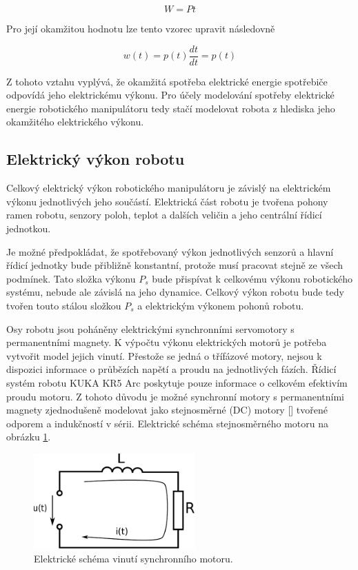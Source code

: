 \begin{equation}
W = Pt
\end{equation}

Pro její okamžitou hodnotu lze tento vzorec upravit následovně

\begin{equation}
w(t) = p(t)\frac{dt}{dt} = p(t)
\end{equation}  

Z tohoto vztahu vyplývá, že okamžitá spotřeba elektrické energie spotřebiče odpovídá jeho elektrickému výkonu. Pro účely modelování spotřeby elektrické energie robotického manipulátoru tedy stačí modelovat robota z hlediska jeho okamžitého elektrického výkonu.  

\subsection{Elektrický výkon robotu}

Celkový elektrický výkon robotického manipulátoru je závislý na elektrickém výkonu jednotlivých jeho součástí. Elektrická část robotu je tvořena pohony ramen robotu, senzory poloh, teplot a dalších veličin a jeho centrální řídicí jednotkou. 

Je možné předpokládat, že spotřebovaný výkon jednotlivých senzorů a hlavní řídicí jednotky bude přibližně konstantní, protože musí pracovat stejně ze všech podmínek. Tato složka výkonu $P_s$ bude přispívat k celkovému výkonu robotického systému, nebude ale závislá na jeho dynamice. Celkový výkon robotu bude tedy tvořen touto stálou složkou $P_s$ a elektrickým výkonem pohonů robotu.

Osy robotu jsou poháněny elektrickými synchronními servomotory s permanentními magnety. K výpočtu výkonu elektrických motorů je potřeba vytvořit model jejich vinutí. Přestože se jedná o třífázové motory, nejsou k dispozici informace o průbězích napětí a proudu na jednotlivých fázích. Řídicí systém robotu KUKA KR5 Arc poskytuje pouze informace o celkovém efektivím proudu motoru. Z tohoto důvodu je možné synchronní motory s permanentními magnety zjednodušeně modelovat jako stejnosměrné (DC) motory [\cite{sbornik}] tvořené odporem a indukčností v sérii. Elektrické schéma stejnosměrného motoru na obrázku \ref{schema_motoru_pic}.  

\newpage
\begin{figure}[ht]
\includegraphics[width=0.55\textwidth]{obvod_motoru}
\caption{Elektrické schéma vinutí synchronního motoru.}
\label{schema_motoru_pic}
\end{figure}

